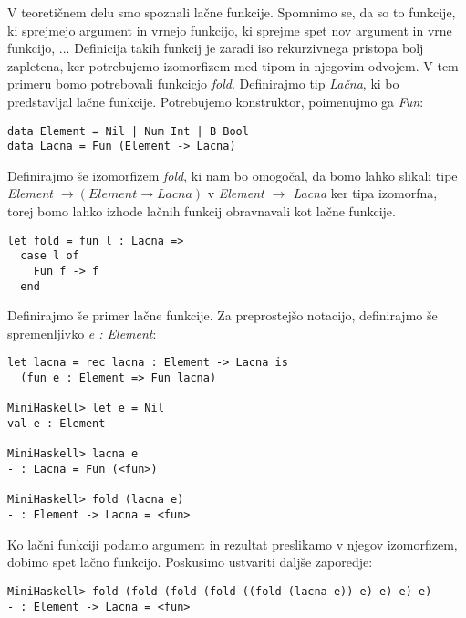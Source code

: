\documentclass[12pt,a4paper,openany]{book}
\begin{document}
V teoretičnem delu smo spoznali lačne funkcije. Spomnimo se, da so to funkcije, ki sprejmejo argument in vrnejo funkcijo, ki sprejme spet nov argument in vrne funkcijo, ... Definicija 
takih funkcij je zaradi iso rekurzivnega pristopa bolj zapletena, ker potrebujemo izomorfizem med tipom in njegovim odvojem. V tem primeru bomo potrebovali funkcicjo \emph{fold}. 
Definirajmo tip \emph{Lačna}, ki bo predstavljal lačne funkcije. Potrebujemo konstruktor, poimenujmo ga \emph{Fun}:
\begin{lstlisting}
data Element = Nil | Num Int | B Bool
data Lacna = Fun (Element -> Lacna)
\end{lstlisting}
Definirajmo še izomorfizem \emph{fold}, ki nam bo omogočal, da bomo lahko slikali tipe \emph{Element $\rightarrow (Element \rightarrow Lacna)$} v \emph{Element $\rightarrow$ Lacna} 
ker tipa izomorfna, torej bomo lahko izhode lačnih funkcij obravnavali kot lačne funkcije.
\begin{lstlisting}
let fold = fun l : Lacna =>
  case l of
    Fun f -> f
  end
\end{lstlisting}
Definirajmo še primer lačne funkcije. Za preprostejšo notacijo, definirajmo še spremenljivko \emph{e : Element}:
\begin{lstlisting}
let lacna = rec lacna : Element -> Lacna is
  (fun e : Element => Fun lacna)

MiniHaskell> let e = Nil
val e : Element

MiniHaskell> lacna e
- : Lacna = Fun (<fun>)

MiniHaskell> fold (lacna e)
- : Element -> Lacna = <fun>
\end{lstlisting}
Ko lačni funkciji podamo argument in rezultat preslikamo v njegov izomorfizem, dobimo spet lačno funkcijo. Poskusimo ustvariti daljše zaporedje:
\begin{lstlisting}
MiniHaskell> fold (fold (fold (fold ((fold (lacna e)) e) e) e) e)
- : Element -> Lacna = <fun>
\end{lstlisting}
\end{document}
